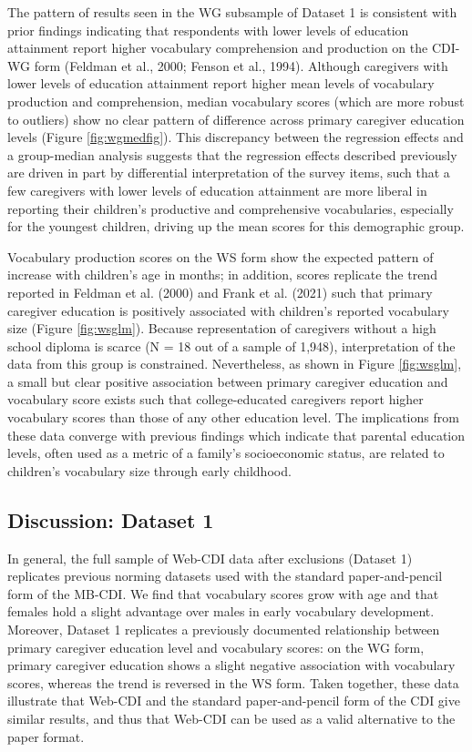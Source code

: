 \documentclass[
  english,
  ,man,floatsintext]{apa6}
\begin{document}
The pattern of results seen in the WG subsample of Dataset 1 is consistent with prior findings indicating that respondents with lower levels of education attainment report higher vocabulary comprehension and production on the CDI-WG form (Feldman et al., 2000; Fenson et al., 1994). Although caregivers with lower levels of education attainment report higher mean levels of vocabulary production and comprehension, median vocabulary scores (which are more robust to outliers) show no clear pattern of difference across primary caregiver education levels (Figure \ref{fig:wgmedfig}). This discrepancy between the regression effects and a group-median analysis suggests that the regression effects described previously are driven in part by differential interpretation of the survey items, such that a few caregivers with lower levels of education attainment are more liberal in reporting their children's productive and comprehensive vocabularies, especially for the youngest children, driving up the mean scores for this demographic group.

Vocabulary production scores on the WS form show the expected pattern of increase with children's age in months; in addition, scores replicate the trend reported in Feldman et al. (2000) and Frank et al. (2021) such that primary caregiver education is positively associated with children's reported vocabulary size (Figure \ref{fig:wsglm}). Because representation of caregivers without a high school diploma is scarce (N = 18 out of a sample of 1,948), interpretation of the data from this group is constrained. Nevertheless, as shown in Figure \ref{fig:wsglm}, a small but clear positive association between primary caregiver education and vocabulary score exists such that college-educated caregivers report higher vocabulary scores than those of any other education level. The implications from these data converge with previous findings which indicate that parental education levels, often used as a metric of a family's socioeconomic status, are related to children's vocabulary size through early childhood.

\hypertarget{discussion-dataset-1}{%
\subsection{Discussion: Dataset 1}\label{discussion-dataset-1}}

In general, the full sample of Web-CDI data after exclusions (Dataset 1) replicates previous norming datasets used with the standard paper-and-pencil form of the MB-CDI. We find that vocabulary scores grow with age and that females hold a slight advantage over males in early vocabulary development. Moreover, Dataset 1 replicates a previously documented relationship between primary caregiver education level and vocabulary scores: on the WG form, primary caregiver education shows a slight negative association with vocabulary scores, whereas the trend is reversed in the WS form. Taken together, these data illustrate that Web-CDI and the standard paper-and-pencil form of the CDI give similar results, and thus that Web-CDI can be used as a valid alternative to the paper format.
\end{document}
